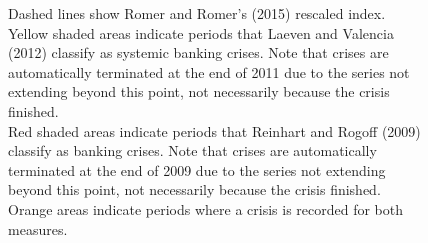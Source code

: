 \documentclass[]{article}
\begin{document}
\begin{figure}
{{    Dashed lines show Romer and Romer's (2015) rescaled index. \\

    Yellow shaded areas indicate periods that Laeven and Valencia (2012) classify as systemic banking crises. Note that crises are automatically terminated at the end of 2011 due to the series not extending beyond this point, not necessarily because the crisis finished. \\

    Red shaded areas indicate periods that Reinhart and Rogoff (2009) classify as banking crises. Note that crises are automatically terminated at the end of 2009 due to the series not extending beyond this point, not necessarily because the crisis finished. \\

    Orange areas indicate periods where a crisis is recorded for both measures.}}
\end{figure}
\end{document}
